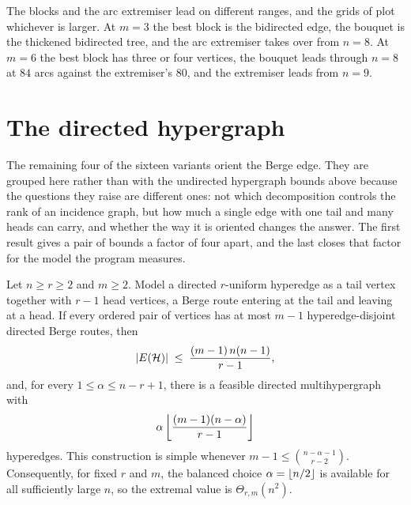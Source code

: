 The blocks and the arc extremiser lead on different ranges, and the grids of
 plot whichever is larger. At $m=3$ the best block is the
bidirected edge, the bouquet is the thickened bidirected tree, and the arc extremiser
takes over from $n=8$. At $m=6$ the best block has three or four vertices, the bouquet
leads through $n=8$ at $84$ arcs against the extremiser's $80$, and the extremiser leads
from $n=9$.

\section{The directed hypergraph}\label{sec:dir-hyper}

The remaining four of the sixteen variants orient the Berge edge. They are grouped here rather than with the undirected hypergraph bounds above because the questions they raise are different ones: not which decomposition controls the rank of an incidence graph, but how much a single edge with one tail and many heads can carry, and whether the way it is oriented changes the answer. The first result gives a pair of bounds a factor of four apart, and the last closes that factor for the model the program measures.

\begin{proposition}\label{prop:dir-hyper-first}
Let $n\ge r\ge2$ and $m\ge2$. Model a directed $r$-uniform hyperedge as a
tail vertex together with $r-1$ head vertices, a Berge route entering at the
tail and leaving at a head. If every ordered pair of vertices has at most $m-1$
hyperedge-disjoint directed Berge routes, then
\[
    |E(\mathcal{H})| \;\le\; \frac{(m-1)\,n(n-1)}{r-1},
\]
and, for every $1\le\alpha\le n-r+1$, there is a feasible directed
multihypergraph with
\[
    \alpha\left\lfloor \frac{(m-1)(n-\alpha)}{r-1} \right\rfloor
\]
hyperedges. This construction is simple whenever
$m-1\le\binom{n-\alpha-1}{r-2}$. Consequently, for fixed $r$ and $m$, the
balanced choice $\alpha=\left\lfloor n/2 \right\rfloor$ is available for all sufficiently large
$n$, so the extremal value is $\Theta_{r,m}(n^2)$.
\end{proposition}


